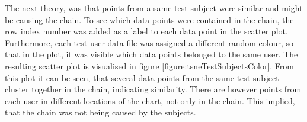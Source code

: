 




The next theory, was that points from a same test subject were similar and might be causing the chain. To see which data points were contained in the chain, the row index number was added as a label to each data point in the scatter plot. Furthermore, each test user data file was assigned a different random colour, so that in the plot, it was visible which data points belonged to the same user. The resulting scatter plot is visualised in figure \ref{figure:tsneTestSubjectsColor}. From this plot it can be seen, that several data points from the same test subject cluster together in the chain, indicating similarity. There are however points from each user in different locations of the chart, not only in the chain. This implied, that the chain was not being caused by the subjects. 

